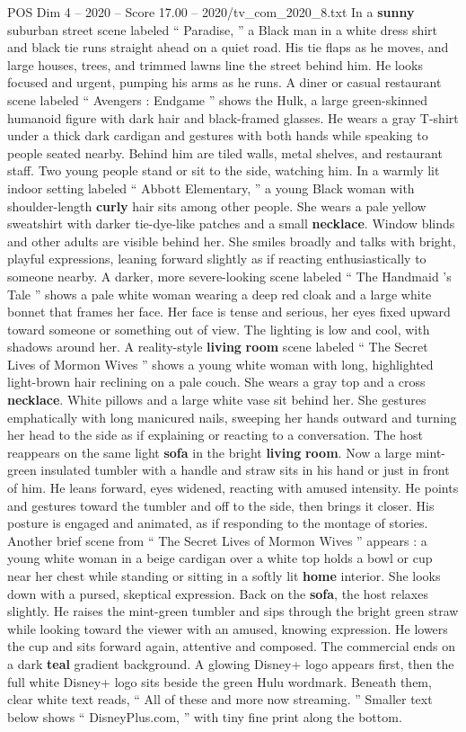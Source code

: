 \begin{textsample}{POS Dim 4 – 2020 – Score 17.00 – 2020/tv\_com\_2020\_8.txt}
In a \textbf{sunny} suburban street scene labeled “ Paradise, ” a Black man in a white dress shirt and black tie runs straight ahead on a quiet road.
His tie flaps as he moves, and large houses, trees, and trimmed lawns line the street behind him.
He looks focused and urgent, pumping his arms as he runs.
A diner or casual restaurant scene labeled “ Avengers : Endgame ” shows the Hulk, a large green-skinned humanoid figure with dark hair and black-framed glasses.
He wears a gray T-shirt under a thick dark cardigan and gestures with both hands while speaking to people seated nearby.
Behind him are tiled walls, metal shelves, and restaurant staff.
Two young people stand or sit to the side, watching him.
In a warmly lit indoor setting labeled “ Abbott Elementary, ” a young Black woman with shoulder-length \textbf{curly} hair sits among other people.
She wears a pale yellow sweatshirt with darker tie-dye-like patches and a small \textbf{necklace}.
Window blinds and other adults are visible behind her.
She smiles broadly and talks with bright, playful expressions, leaning forward slightly as if reacting enthusiastically to someone nearby.
A darker, more severe-looking scene labeled “ The Handmaid ’s Tale ” shows a pale white woman wearing a deep red cloak and a large white bonnet that frames her face.
Her face is tense and serious, her eyes fixed upward toward someone or something out of view.
The lighting is low and cool, with shadows around her.
A reality-style \textbf{living} \textbf{room} scene labeled “ The Secret Lives of Mormon Wives ” shows a young white woman with long, highlighted light-brown hair reclining on a pale couch.
She wears a gray top and a cross \textbf{necklace}.
White pillows and a large white vase sit behind her.
She gestures emphatically with long manicured nails, sweeping her hands outward and turning her head to the side as if explaining or reacting to a conversation.
The host reappears on the same light \textbf{sofa} in the bright \textbf{living} \textbf{room}.
Now a large mint-green insulated tumbler with a handle and straw sits in his hand or just in front of him.
He leans forward, eyes widened, reacting with amused intensity.
He points and gestures toward the tumbler and off to the side, then brings it closer.
His posture is engaged and animated, as if responding to the montage of stories.
Another brief scene from “ The Secret Lives of Mormon Wives ” appears : a young white woman in a beige cardigan over a white top holds a bowl or cup near her chest while standing or sitting in a softly lit \textbf{home} interior.
She looks down with a pursed, skeptical expression.
Back on the \textbf{sofa}, the host relaxes slightly.
He raises the mint-green tumbler and sips through the bright green straw while looking toward the viewer with an amused, knowing expression.
He lowers the cup and sits forward again, attentive and composed.
The commercial ends on a dark \textbf{teal} gradient background.
A glowing Disney+ logo appears first, then the full white Disney+ logo sits beside the green Hulu wordmark.
Beneath them, clear white text reads, “ All of these and more now streaming. ” Smaller text below shows “ DisneyPlus.com, ” with tiny fine print along the bottom.


\end{textsample}
